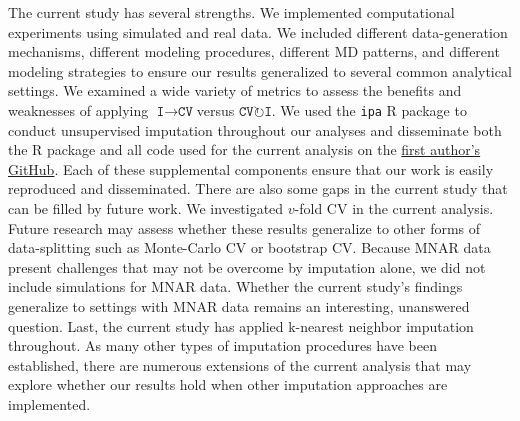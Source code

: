 \documentclass[AMA,STIX1COL,doublespace]{WileyNJD-v2}
\begin{document}
The current study has several strengths. We implemented computational
experiments using simulated and real data. We included different
data-generation mechanisms, different modeling procedures, different MD
patterns, and different modeling strategies to ensure our results
generalized to several common analytical settings. We examined a wide
variety of metrics to assess the benefits and weaknesses of applying
$\texttt{I}\!\!\rightarrow\!\texttt{CV}$\space versus
$\texttt{CV}\!\circlearrowright\!\texttt{I}$. We used the \texttt{ipa} R
package to conduct unsupervised imputation throughout our analyses and
disseminate both the R package and all code used for the current
analysis on the
\href{https://github.com/bcjaeger/Imputation-and-CV}{first author's
GitHub}. Each of these supplemental components ensure that our work is
easily reproduced and disseminated. There are also some gaps in the
current study that can be filled by future work. We investigated
\(v\)-fold CV in the current analysis. Future research may assess
whether these results generalize to other forms of data-splitting such
as Monte-Carlo CV or bootstrap CV. Because MNAR data present challenges
that may not be overcome by imputation alone, we did not include
simulations for MNAR data. Whether the current study's findings
generalize to settings with MNAR data remains an interesting, unanswered
question. Last, the current study has applied k-nearest neighbor
imputation throughout. As many other types of imputation procedures have
been established, there are numerous extensions of the current analysis
that may explore whether our results hold when other imputation
approaches are implemented.

\FloatBarrier
\end{document}
